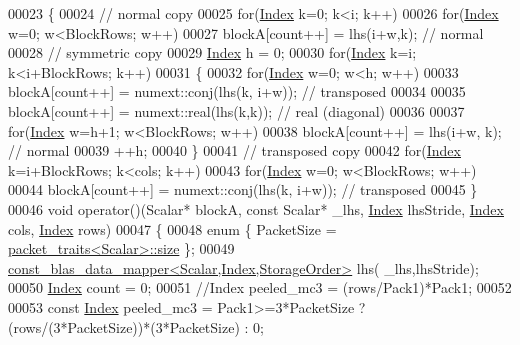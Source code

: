 \begin{DoxyCode}
00023   \{
00024     \textcolor{comment}{// normal copy}
00025     \textcolor{keywordflow}{for}(\hyperlink{namespace_eigen_a62e77e0933482dafde8fe197d9a2cfde}{Index} k=0; k<i; k++)
00026       \textcolor{keywordflow}{for}(\hyperlink{namespace_eigen_a62e77e0933482dafde8fe197d9a2cfde}{Index} w=0; w<BlockRows; w++)
00027         blockA[count++] = lhs(i+w,k);           \textcolor{comment}{// normal}
00028     \textcolor{comment}{// symmetric copy}
00029     \hyperlink{namespace_eigen_a62e77e0933482dafde8fe197d9a2cfde}{Index} h = 0;
00030     \textcolor{keywordflow}{for}(\hyperlink{namespace_eigen_a62e77e0933482dafde8fe197d9a2cfde}{Index} k=i; k<i+BlockRows; k++)
00031     \{
00032       \textcolor{keywordflow}{for}(\hyperlink{namespace_eigen_a62e77e0933482dafde8fe197d9a2cfde}{Index} w=0; w<h; w++)
00033         blockA[count++] = numext::conj(lhs(k, i+w)); \textcolor{comment}{// transposed}
00034 
00035       blockA[count++] = numext::real(lhs(k,k));   \textcolor{comment}{// real (diagonal)}
00036 
00037       \textcolor{keywordflow}{for}(\hyperlink{namespace_eigen_a62e77e0933482dafde8fe197d9a2cfde}{Index} w=h+1; w<BlockRows; w++)
00038         blockA[count++] = lhs(i+w, k);          \textcolor{comment}{// normal}
00039       ++h;
00040     \}
00041     \textcolor{comment}{// transposed copy}
00042     \textcolor{keywordflow}{for}(\hyperlink{namespace_eigen_a62e77e0933482dafde8fe197d9a2cfde}{Index} k=i+BlockRows; k<cols; k++)
00043       \textcolor{keywordflow}{for}(\hyperlink{namespace_eigen_a62e77e0933482dafde8fe197d9a2cfde}{Index} w=0; w<BlockRows; w++)
00044         blockA[count++] = numext::conj(lhs(k, i+w)); \textcolor{comment}{// transposed}
00045   \}
00046   \textcolor{keywordtype}{void} operator()(Scalar* blockA, \textcolor{keyword}{const} Scalar* \_lhs, \hyperlink{namespace_eigen_a62e77e0933482dafde8fe197d9a2cfde}{Index} lhsStride, 
      \hyperlink{namespace_eigen_a62e77e0933482dafde8fe197d9a2cfde}{Index} cols, \hyperlink{namespace_eigen_a62e77e0933482dafde8fe197d9a2cfde}{Index} rows)
00047   \{
00048     \textcolor{keyword}{enum} \{ PacketSize = \hyperlink{struct_eigen_1_1internal_1_1packet__traits}{packet\_traits<Scalar>::size} \};
00049     \hyperlink{class_eigen_1_1internal_1_1const__blas__data__mapper}{const\_blas\_data\_mapper<Scalar,Index,StorageOrder>} lhs(
      \_lhs,lhsStride);
00050     \hyperlink{namespace_eigen_a62e77e0933482dafde8fe197d9a2cfde}{Index} count = 0;
00051     \textcolor{comment}{//Index peeled\_mc3 = (rows/Pack1)*Pack1;}
00052     
00053     \textcolor{keyword}{const} \hyperlink{namespace_eigen_a62e77e0933482dafde8fe197d9a2cfde}{Index} peeled\_mc3 = Pack1>=3*PacketSize ? (rows/(3*PacketSize))*(3*PacketSize) : 0;

\end{DoxyCode}
